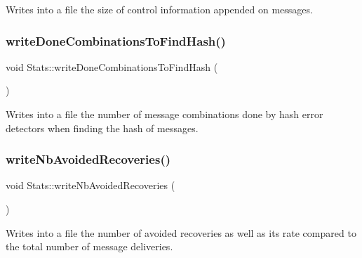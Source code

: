 Writes into a file the size of control information appended on messages. 

\mbox{\label{class_stats_a73a83aa6b190ceb71e8ed2b131338d81}} 
\subsubsection{\texorpdfstring{write\+Done\+Combinations\+To\+Find\+Hash()}{writeDoneCombinationsToFindHash()}}
{\footnotesize\ttfamily void Stats\+::write\+Done\+Combinations\+To\+Find\+Hash (\begin{DoxyParamCaption}{ }\end{DoxyParamCaption})\hspace{0.3cm}{\ttfamily [private]}}



Writes into a file the number of message combinations done by hash error detectors when finding the hash of messages. 

\mbox{\label{class_stats_ac6a0fdf44cc2a3dc11ff22eb75faacf2}} 
\subsubsection{\texorpdfstring{write\+Nb\+Avoided\+Recoveries()}{writeNbAvoidedRecoveries()}}
{\footnotesize\ttfamily void Stats\+::write\+Nb\+Avoided\+Recoveries (\begin{DoxyParamCaption}{ }\end{DoxyParamCaption})\hspace{0.3cm}{\ttfamily [private]}}



Writes into a file the number of avoided recoveries as well as its rate compared to the total number of message deliveries. 

\mbox{\label{class_stats_afff16579776ca8a5e5dbc4483689c2e4}} 
